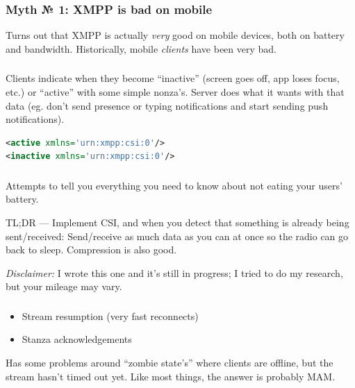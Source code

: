 \documentclass[xelatex,aspectratio=169]{beamer}
\begin{document}
\begin{frame}
	\frametitle{Myth № 1: XMPP is bad on mobile}
	Turns out that XMPP is actually \emph{very} good on mobile devices, both on
	battery and bandwidth. Historically, mobile \emph{clients} have been very bad.
\end{frame}

\begin{frame}[fragile]
	\frametitle{}
	Clients indicate when they become ``inactive'' (screen goes off, app loses
	focus, etc.) or ``active'' with some simple nonza's. Server does what it wants
	with that data (eg. don't send presence or typing notifications and start
	sending push notifications).
	\vspace*{\fill}
\begin{lstlisting}[frame=single,language=xml]
<active xmlns='urn:xmpp:csi:0'/>
<inactive xmlns='urn:xmpp:csi:0'/>
\end{lstlisting}
\vspace*{\fill}
\end{frame}

\begin{frame}
	\frametitle{}
	\begin{flushleft}
		Attempts to tell you everything you need to know about not eating your
		users' battery.
	\end{flushleft}
	\begin{flushleft}
		TL;DR --- Implement CSI, and when you detect that something is already being
		sent/received: Send/receive as much data as you can at once so the radio can
		go back to sleep. Compression is also good.
	\end{flushleft}
	\begin{flushleft}
		\emph{Disclaimer:} I wrote this one and it's still in progress; I tried to
		do my research, but your mileage may vary.
	\end{flushleft}
\end{frame}

\begin{frame}
	\frametitle{}
	\begin{itemize}
		\item Stream resumption (very fast reconnects)
		\item Stanza acknowledgements
	\end{itemize}

	Has some problems around ``zombie state's'' where clients are offline, but the
	stream hasn't timed out yet. Like most things, the answer is probably MAM.
\end{frame}
\end{document}
